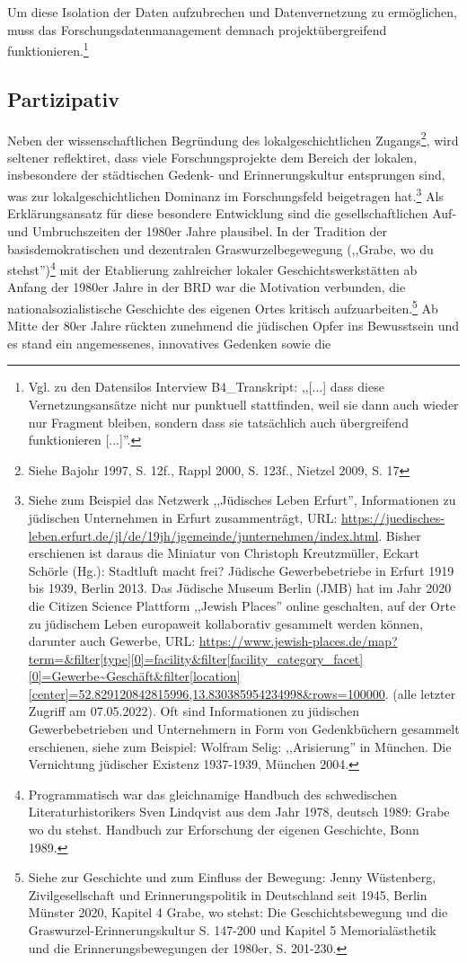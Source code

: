 Um diese Isolation der Daten aufzubrechen und Datenvernetzung zu ermöglichen, muss das Forschungsdatenmanagement demnach projektübergreifend funktionieren.\footnote{Vgl. zu den Datensilos Interview B4\_Transkript: ,,[...] dass diese Vernetzungsansätze nicht nur punktuell stattfinden, weil sie dann auch wieder nur Fragment bleiben, sondern dass sie tatsächlich auch übergreifend funktionieren [...]''.}

\subsection{Partizipativ} 

Neben der wissenschaftlichen Begründung des lokalgeschichtlichen Zugangs\footnote{Siehe Bajohr 1997, S. 12f., Rappl 2000, S. 123f., Nietzel 2009, S. 17}, wird seltener reflektiret, dass viele Forschungsprojekte dem Bereich der lokalen, insbesondere der städtischen Gedenk- und Erinnerungskultur entsprungen sind, was zur lokalgeschichtlichen Dominanz im Forschungsfeld beigetragen hat.\footnote{Siehe zum Beispiel das Netzwerk ,,Jüdisches Leben Erfurt'', Informationen zu jüdischen Unternehmen in Erfurt zusammenträgt, URL: \url{https://juedisches-leben.erfurt.de/jl/de/19jh/jgemeinde/junternehmen/index.html}. Bisher erschienen ist daraus die Miniatur von Christoph Kreutzmüller, Eckart Schörle (Hg.): Stadtluft macht frei? Jüdische Gewerbebetriebe in Erfurt 1919 bis 1939, Berlin 2013. Das Jüdische Museum Berlin (JMB) hat im Jahr 2020 die Citizen Science Plattform ,,Jewish Places'' online geschalten, auf der Orte zu jüdischem Leben europaweit kollaborativ gesammelt werden können, darunter auch Gewerbe, URL: \url{https://www.jewish-places.de/map?term=&filter[type][0]=facility&filter[facility_category_facet][0]=Gewerbe~Geschäft&filter[location][center]=52.829120842815996,13.830385954234998&rows=100000}. (alle letzter Zugriff am 07.05.2022). Oft sind Informationen zu jüdischen Gewerbebetrieben und Unternehmern in Form von Gedenkbüchern gesammelt erschienen, siehe zum Beispiel: Wolfram Selig: ,,Arisierung'' in München. Die Vernichtung jüdischer Existenz 1937-1939, München 2004.} Als Erklärungsansatz für diese besondere Entwicklung sind die gesellschaftlichen Auf- und Umbruchszeiten der 1980er Jahre plausibel. In der Tradition der basisdemokratischen und dezentralen Graswurzelbegewegung (,,Grabe, wo du stehst'')\footnote{Programmatisch war das gleichnamige Handbuch des schwedischen Literaturhistorikers Sven Lindqvist aus dem Jahr 1978, deutsch 1989: Grabe wo du stehst. Handbuch zur Erforschung der eigenen Geschichte, Bonn 1989.} mit der Etablierung zahlreicher lokaler Geschichtswerkstätten ab Anfang der 1980er Jahre in der BRD war die Motivation verbunden, die nationalsozialistische Geschichte des eigenen Ortes kritisch aufzuarbeiten.\footnote{Siehe zur Geschichte und zum Einfluss der Bewegung: Jenny Wüstenberg, Zivilgesellschaft und Erinnerungspolitik in Deutschland seit 1945, Berlin Münster 2020, Kapitel 4 Grabe, wo stehst: Die Geschichtsbewegung und die Graswurzel-Erinnerungskultur S. 147-200 und Kapitel 5 Memorialästhetik und die Erinnerungsbewegungen der 1980er, S. 201-230.} Ab Mitte der 80er Jahre rückten zunehmend die jüdischen Opfer ins Bewusstsein und es stand ein angemessenes, innovatives Gedenken sowie die 